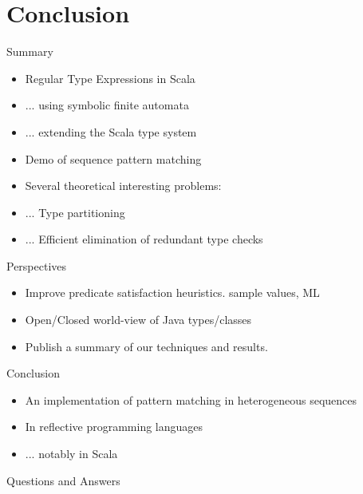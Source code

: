 \section{Conclusion}

{  %
\begin{frame}{Summary}
  \begin{itemize}
  \item Regular Type Expressions in Scala
  \item ... using symbolic finite automata
  \item ... extending the Scala type system
  \item Demo of sequence pattern matching
  \item Several theoretical interesting problems:
  \item ... Type partitioning
  \item ... Efficient elimination of redundant type checks
  \end{itemize}
\end{frame}
}

\begin{frame}{Perspectives}
  \begin{itemize}
  \item Improve predicate satisfaction heuristics. \Eg sample values, ML
  \item Open/Closed world-view of Java types/classes
  \item Publish a summary of our techniques and results.
  \end{itemize}
\end{frame}

\begin{frame}{Conclusion}
  \begin{itemize}
  \item An implementation of pattern matching in heterogeneous sequences
  \item In reflective programming languages
  \item ... notably in Scala
  \end{itemize}
\end{frame}

\begin{frame}{Questions and Answers}
\end{frame}
